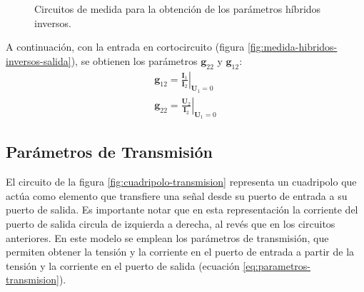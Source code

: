 \begin{figure}[H]
  \centering
  \hspace{2cm}
\caption{Circuitos de medida para la obtención de los parámetros híbridos inversos.}
  \label{fig:medida-hibridos-inversos}
\end{figure}


A continuación, con la entrada en cortocircuito (figura \ref{fig:medida-hibridos-inversos-salida}), se obtienen los parámetros $\mathbf{g}_{22}$ y $\mathbf{g}_{12}$:
\[
  \begin{array}{c}
    \mathbf{g}_{12} = \left.\frac{\mathbf{I}_1}{\mathbf{I}_2}\right\rvert_{\mathbf{U}_1 = 0}\\
    \mathbf{g}_{22} = \left.\frac{\mathbf{U}_2}{\mathbf{I}_2}\right\rvert_{\mathbf{U}_1 = 0}
  \end{array}
\]


\subsection{Parámetros de Transmisión}
El circuito de la figura \ref{fig:cuadripolo-transmision} representa un cuadripolo que actúa como elemento que transfiere una señal desde su puerto de entrada a su puerto de salida. Es importante notar que en esta representación  la corriente del puerto de salida circula de izquierda a derecha, al revés que en los circuitos anteriores. En este modelo se emplean los parámetros de transmisión, que permiten obtener la tensión y la corriente en el puerto de entrada a partir de la tensión y la corriente en el puerto de salida (ecuación \ref{eq:parametros-transmision}).

